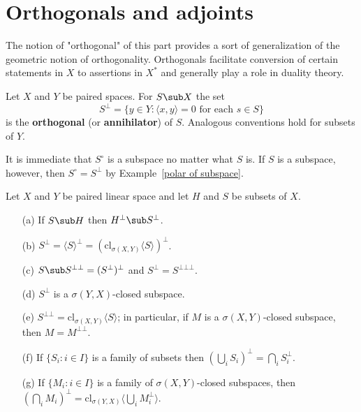 \section{Orthogonals and adjoints}
The notion of "orthogonal" of this part provides a sort of generalization of the geometric notion of orthogonality. Orthogonals facilitate conversion of certain statements in $X$ to assertions in $X^*$ and generally play a role in duality theory.
\begin{definition}
Let $X$ and $Y$ be paired spaces. For $S\sub X$ the set
\[S^\bot=\{y\in Y:\langle x,y\rangle=0\text{ for each $s\in S$}\}\]
is the \textbf{orthogonal} (or \textbf{annihilator}) of $S$. Analogous conventions hold for subsets of $Y$.
\end{definition}
It is immediate that $S^\circ$ is a subspace no matter what $S$ is. If $S$ is a subspace, however, then $S^\circ=S^\bot$ by Example~\ref{polar of subspace}.
\begin{proposition}\label{pair annihilator prop}
Let $X$ and $Y$ be paired linear space and let $H$ and $S$ be subsets of $X$.
\begin{itemize}
\item[(a)] If $S\sub H$ then $H^\bot\sub S^\bot$.
\item[(b)] $S^\bot=\langle S\rangle^\bot=(\mathrm{cl}_{\sigma(X,Y)}\langle S\rangle)^\bot$.
\item[(c)] $S\sub S^{\bot\bot}=(S^\bot)^\bot$ and $S^\bot=S^{\bot\bot\bot}$.
\item[(d)] $S^\bot$ is a $\sigma(Y,X)$-closed subspace.
\item[(e)] $S^{\bot\bot}=\mathrm{cl}_{\sigma(X,Y)}\langle S\rangle$; in particular, if $M$ is a $\sigma(X,Y)$-closed subspace, then $M=M^{\bot\bot}$.
\item[(f)] If $\{S_i:i\in I\}$ is a family of subsets then $(\bigcup_iS_i)^\bot=\bigcap_iS_i^\bot$.
\item[(g)] If $\{M_i:i\in I\}$ is a family of $\sigma(X,Y)$-closed subspaces, then $(\bigcap_iM_i)^\bot=\mathrm{cl}_{\sigma(Y,X)}\langle\bigcup_iM_i^\bot\rangle$. 
\end{itemize}
\end{proposition}
